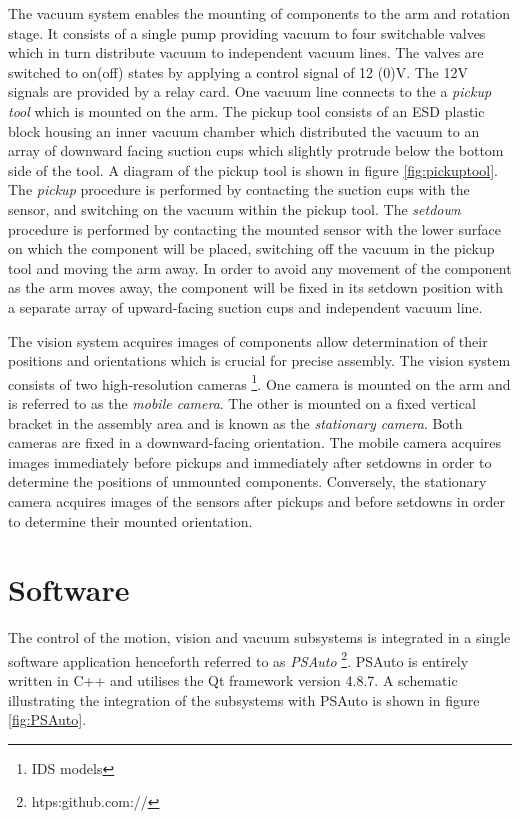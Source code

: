 \documentclass[fleqn,10pt]{SelfArx} %
\begin{document}
The vacuum system enables the mounting of components to the arm and rotation stage. It consists of a single pump providing vacuum to four switchable valves which in turn distribute vacuum to independent vacuum lines. The valves are switched to on(off) states by applying a control signal of 12 (0)V. The 12V signals are provided by a relay card. One vacuum line connects to the a \emph{pickup tool} which is mounted on the arm. The pickup tool consists of an ESD plastic block housing an inner vacuum chamber which distributed the vacuum to an array of downward facing suction cups which slightly protrude below the bottom side of the tool. A diagram of the pickup tool is shown in figure \ref{fig:pickuptool}. The \emph{pickup} procedure is performed by contacting the suction cups with the sensor, and switching 
on the vacuum within the pickup tool. The \emph{setdown} procedure is performed by contacting the mounted sensor with the lower surface on which the component will be placed, switching off the vacuum in the pickup tool and moving the arm away. In order to avoid any movement of the component as the arm moves away, the component will be fixed in its setdown position with a separate array of upward-facing suction cups and independent vacuum line.


The vision system acquires images of components allow determination of their positions and orientations which is crucial for precise assembly. The vision system consists of two high-resolution cameras \footnote{IDS models}. One camera is mounted on the arm and is referred to as the \emph{mobile camera}. The other is mounted on a fixed vertical bracket in the assembly area and is known as the \emph{stationary camera}. Both cameras are fixed in a downward-facing orientation. The mobile camera acquires images immediately before pickups and immediately after setdowns in order to determine the positions of unmounted components. Conversely, the stationary camera acquires images of the sensors after pickups and before setdowns in order to determine their mounted orientation.


\section{Software}
The control of the motion, vision and vacuum subsystems is integrated in a single software application henceforth referred to as \emph{PSAuto} \footnote{htps:github.com://}.  PSAuto is entirely written in C++ and utilises the Qt framework version 4.8.7.  A schematic illustrating the integration of the subsystems with PSAuto is shown in figure \ref{fig:PSAuto}.
\end{document}
